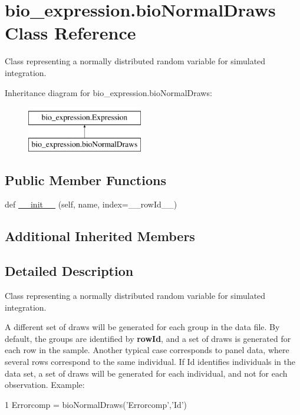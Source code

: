 \hypertarget{classbio__expression_1_1bio_normal_draws}{}\section{bio\+\_\+expression.\+bio\+Normal\+Draws Class Reference}
\label{classbio__expression_1_1bio_normal_draws}


Class representing a normally distributed random variable for simulated integration.  


Inheritance diagram for bio\+\_\+expression.\+bio\+Normal\+Draws\+:\begin{figure}[H]
\begin{center}
\leavevmode
\includegraphics[height=2.000000cm]{classbio__expression_1_1bio_normal_draws}
\end{center}
\end{figure}
\subsection*{Public Member Functions}
\begin{DoxyCompactItemize}
\item 
def \hyperlink{classbio__expression_1_1bio_normal_draws_a00550e28e394b57a96e18a2053d77b69}{\+\_\+\+\_\+init\+\_\+\+\_\+} (self, name, index=\textquotesingle{}\+\_\+\+\_\+row\+Id\+\_\+\+\_\+\textquotesingle{})
\end{DoxyCompactItemize}
\subsection*{Additional Inherited Members}


\subsection{Detailed Description}
Class representing a normally distributed random variable for simulated integration. 

A different set of draws will be generated for each group in the data file. By default, the groups are identified by {\bfseries row\+Id}, and a set of draws is generated for each row in the sample. Another typical case corresponds to panel data, where several rows correspond to the same individual. If Id identifies individuals in the data set, a set of draws will be generated for each individual, and not for each observation. Example\+: 
\begin{DoxyCode}
1 Errorcomp = bioNormalDraws(\textcolor{stringliteral}{'Errorcomp'},\textcolor{stringliteral}{'Id'})
\end{DoxyCode}
 

